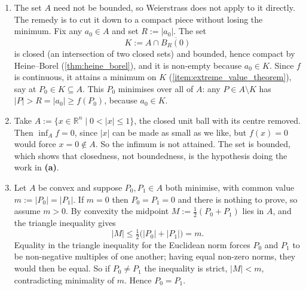 \begin{exercisesolution}
\label{sol:nearest_point_to_origin}
\begin{enumerate}[label=\textbf{(\alph*)}]
  \item The set $A$ need not be bounded, so Weierstrass does not apply to it directly. The remedy is
    to cut it down to a compact piece without losing the minimum. Fix any $a_0 \in A$ and set
    $R := \lvert a_0\rvert$. The set
\[K := A \cap \overline{B_R(0)}\]
    is closed (an intersection of two closed sets) and bounded, hence compact by Heine--Borel
    (\cref{thm:heine_borel}), and it is non-empty because $a_0 \in K$. Since $f$ is continuous, it
    attains a minimum on $K$ (\cref{item:extreme_value_theorem}), say at $P_0 \in K \subseteq A$.
    This $P_0$ minimises over all of $A$: any $P \in A \setminus K$ has $\lvert P\rvert > R =
    \lvert a_0\rvert \ge f(P_0)$, because $a_0 \in K$.

  \item Take $A := \{x \in \mathbb{R}^n \mid 0 < \lvert x\rvert \le 1\}$, the closed unit ball with
    its centre removed. Then $\inf_A f = 0$, since $\lvert x\rvert$ can be made as small as we like,
    but $f(x) = 0$ would force $x = 0 \notin A$. So the infimum is not attained. The set is bounded,
    which shows that closedness, not boundedness, is the hypothesis doing the work in
    \textbf{(a)}.

  \item Let $A$ be convex and suppose $P_0, P_1 \in A$ both minimise, with common value
    $m := \lvert P_0\rvert = \lvert P_1\rvert$. If $m = 0$ then $P_0 = P_1 = 0$ and there is nothing
    to prove, so assume $m > 0$. By convexity the midpoint $M := \tfrac12(P_0+P_1)$ lies in $A$, and
    the triangle inequality gives
\[\lvert M\rvert \le \tfrac12\big(\lvert P_0\rvert + \lvert P_1\rvert\big) = m.\]
    Equality in the triangle inequality for the Euclidean norm forces $P_0$ and $P_1$ to be
    non-negative multiples of one another; having equal non-zero norms, they would then be equal.
    So if $P_0 \neq P_1$ the inequality is strict, $\lvert M\rvert < m$, contradicting minimality of
    $m$. Hence $P_0 = P_1$.


\end{enumerate}
\end{exercisesolution}
